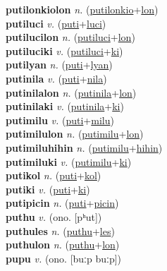 \textbf{putilonkiolon} \textit{n.} (\hyperref[putilonkio]{putilonkio}+\hyperref[lon]{lon})
 \label{putilonkiolon} \\
\textbf{putiluci} \textit{v.} (\hyperref[puti]{puti}+\hyperref[luci]{luci})
 \label{putiluci} \\
\textbf{putilucilon} \textit{n.} (\hyperref[putiluci]{putiluci}+\hyperref[lon]{lon})
 \label{putilucilon} \\
\textbf{putiluciki} \textit{v.} (\hyperref[putiluci]{putiluci}+\hyperref[ki]{ki})
 \label{putiluciki} \\
\textbf{putilyan} \textit{n.} (\hyperref[puti]{puti}+\hyperref[lyan]{lyan})
 \label{putilyan} \\
\textbf{putinila} \textit{v.} (\hyperref[puti]{puti}+\hyperref[nila]{nila})
 \label{putinila} \\
\textbf{putinilalon} \textit{n.} (\hyperref[putinila]{putinila}+\hyperref[lon]{lon})
 \label{putinilalon} \\
\textbf{putinilaki} \textit{v.} (\hyperref[putinila]{putinila}+\hyperref[ki]{ki})
 \label{putinilaki} \\
\textbf{putimilu} \textit{v.} (\hyperref[puti]{puti}+\hyperref[milu]{milu})
 \label{putimilu} \\
\textbf{putimilulon} \textit{n.} (\hyperref[putimilu]{putimilu}+\hyperref[lon]{lon})
 \label{putimilulon} \\
\textbf{putimiluhihin} \textit{n.} (\hyperref[putimilu]{putimilu}+\hyperref[hihin]{hihin})
 \label{putimiluhihin} \\
\textbf{putimiluki} \textit{v.} (\hyperref[putimilu]{putimilu}+\hyperref[ki]{ki})
 \label{putimiluki} \\
\textbf{putikol} \textit{n.} (\hyperref[puti]{puti}+\hyperref[kol]{kol})
 \label{putikol} \\
\textbf{putiki} \textit{v.} (\hyperref[puti]{puti}+\hyperref[ki]{ki})
 \label{putiki} \\
\textbf{putipicin} \textit{n.} (\hyperref[puti]{puti}+\hyperref[picin]{picin})
 \label{putipicin} \\
\textbf{puthu} \textit{v.} (ono. [pʰut])
 \label{puthu} \\
\textbf{puthules} \textit{n.} (\hyperref[puthu]{puthu}+\hyperref[les]{les})
 \label{puthules} \\
\textbf{puthulon} \textit{n.} (\hyperref[puthu]{puthu}+\hyperref[lon]{lon})
 \label{puthulon} \\
\textbf{pupu} \textit{v.} (ono. [buːp buːp])
 \label{pupu} \\
